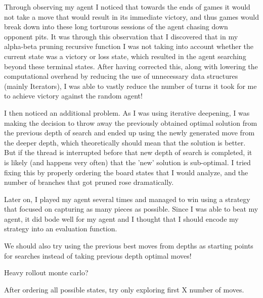 \documentclass{article}
\begin{document}
Through observing my agent I noticed that towards the ends of games it would not take a move that would result in its immediate victory, and thus
games would break down into these long torturous sessions of the agent chasing down opponent pits. It was through this observation that
I discovered that in my alpha-beta pruning recursive function I was not taking into account whether the current state was a victory or loss state,
which resulted in the agent searching beyond these terminal states. After having corrected this, along with lowering the computational overhead by reducing
the use of unnecessary data structures (mainly Iterators), I was able to vastly reduce the number of turns it took for me to achieve victory against 
the random agent!

I then noticed an additional problem. As I was using iterative deepening, I was making the decision to throw away the previously obtained optimal solution from the
previous depth of search and ended up using the newly generated move from the deeper depth, which theoretically should mean that the solution is better. But if the thread
is interrupted before that new depth of search is completed, it is likely (and happens very often) that the 'new' solution is sub-optimal. I tried fixing this by properly ordering
the board states that I would analyze, and the number of branches that got pruned rose dramatically.

Later on, I played my agent several times and managed to win using a strategy that focused on capturing as many pieces as possible. Since I was able to beat my agent, it
did bode well for my agent and I thought that I should encode my strategy into an evaluation function.

We should also try using the previous best moves from depths as starting points for searches instead of taking previous depth optimal moves!

Heavy rollout monte carlo?

After ordering all possible states, try only exploring first X number of moves.
\end{document}
